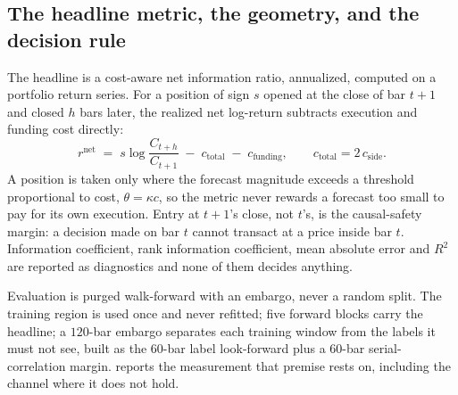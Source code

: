 \subsection{The headline metric, the geometry, and the decision rule}
\label{sec:metric}
\label{sec:geometry}
\label{sec:decision}

The headline is a cost-aware net information ratio, annualized, computed on a portfolio return
series. For a position of sign $s$ opened at the close of bar $t+1$ and closed $h$ bars later, the
realized net log-return subtracts execution and funding cost directly:
\begin{equation}
  r^{\text{net}} \;=\; s \log\!\frac{C_{t+h}}{C_{t+1}} \;-\; c_{\text{total}} \;-\; c_{\text{funding}},
  \qquad c_{\text{total}} = 2\,c_{\text{side}} .
  \label{eq:netret}
\end{equation}
A position is taken only where the forecast magnitude exceeds a threshold proportional to cost,
$\theta = \kappa c$, so the metric never rewards a forecast too small to pay for its own execution.
Entry at $t+1$'s close, not $t$'s, is the causal-safety margin: a decision made on bar $t$ cannot
transact at a price inside bar $t$. Information coefficient, rank information coefficient, mean
absolute error and $R^2$ are reported as diagnostics and none of them decides anything.

Evaluation is purged walk-forward with an embargo, never a random split. The training region is
used once and never refitted; five forward blocks carry the headline; a $120$-bar embargo separates
each training window from the labels it must not see, built as the $60$-bar label look-forward plus
a $60$-bar serial-correlation margin.  reports the measurement that premise
rests on, including the channel where it does not hold.

